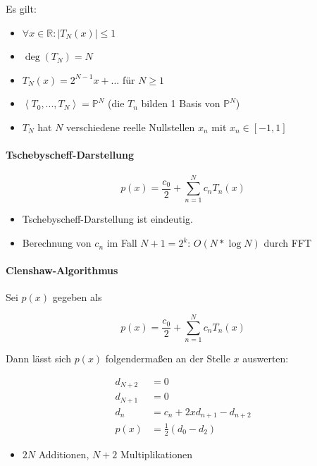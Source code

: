\documentclass[a4paper, 14pt]{article}
\begin{document}
	Es gilt:
	
	\begin{itemize}
		\item $\forall x \in \mathbb{R} : |T_N(x)| \leq 1$
		\item $\deg(T_N) = N$
		\item $T_N(x) = 2^{N - 1}x + ...$ für $N \geq 1$
		\item $\left< T_0, ..., T_N \right> = \mathbb{P}^N$ (die $T_n$ bilden 1 Basis von $\mathbb{P}^N$)
		\item $T_N$ hat $N$ verschiedene reelle Nullstellen $x_n$ mit $x_n \in [-1, 1]$
	\end{itemize}

	\paragraph{Tschebyscheff-Darstellung}

	\begin{equation}
		p(x) = \frac{c_0}{2} + \sum_{n = 1}^{N}{c_n T_n(x)}
	\end{equation}

	\begin{itemize}
		\item Tschebyscheff-Darstellung ist eindeutig.
		\item Berechnung von $c_n$ im Fall $N + 1 = 2^k$: $O(N * \log N)$ durch FFT
	\end{itemize}

	\paragraph{Clenshaw-Algorithmus}

	Sei $p(x)$ gegeben als

	\begin{equation}
		p(x) = \frac{c_0}{2} + \sum_{n = 1}^{N}{c_n T_n(x)}
	\end{equation}

	Dann lässt sich $p(x)$ folgendermaßen an der Stelle $x$ auswerten:

	\begin{align}
		d_{N + 2} & = 0 \\
		d_{N + 1} & = 0 \\
		d_n       & = c_n + 2xd_{n + 1} - d_{n + 2} \\
		p(x)      & = \frac{1}{2} (d_0 - d_2)
	\end{align}

	\begin{itemize}
		\item $2N$ Additionen, $N + 2$ Multiplikationen
	\end{itemize}
\end{document}
